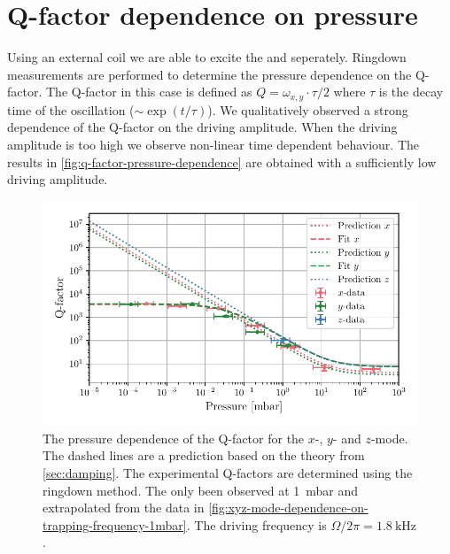 \section{Q-factor dependence on pressure}
\label{sec:q-factor-dependence-on-pressure}
Using an external coil we are able to excite the \xmode  and \ymode seperately. Ringdown measurements are performed to determine the pressure dependence on the Q-factor. The Q-factor in this case is defined as $Q = \omega_{x,y} \cdot \tau / 2$ where $\tau$ is the decay time of the oscillation ($\sim \exp\left(t / \tau\right)$). We qualitatively observed a strong dependence of the Q-factor on the driving amplitude. When the driving amplitude is too high we observe non-linear time dependent behaviour. The results in \autoref{fig:q-factor-pressure-dependence} are obtained with a sufficiently low driving amplitude.

\begin{figure}
    \centering
    \includegraphics{figures/data/q_factor_pressure_dependence.pdf}
    \caption{The pressure dependence of the Q-factor for the $x$-, $y$- and $z$-mode. The dashed lines are a prediction based on the theory from \autoref{sec:damping}. The experimental Q-factors are determined using the ringdown method. The \zmode only been observed at \qty{1}{\milli\bar} and extrapolated from the data in \autoref{fig:xyz-mode-dependence-on-trapping-frequency-1mbar}. The driving frequency is $\Omega/2\pi = \qty{1.8}{\kilo\hertz}$.}
    \label{fig:q-factor-pressure-dependence}
\end{figure}

